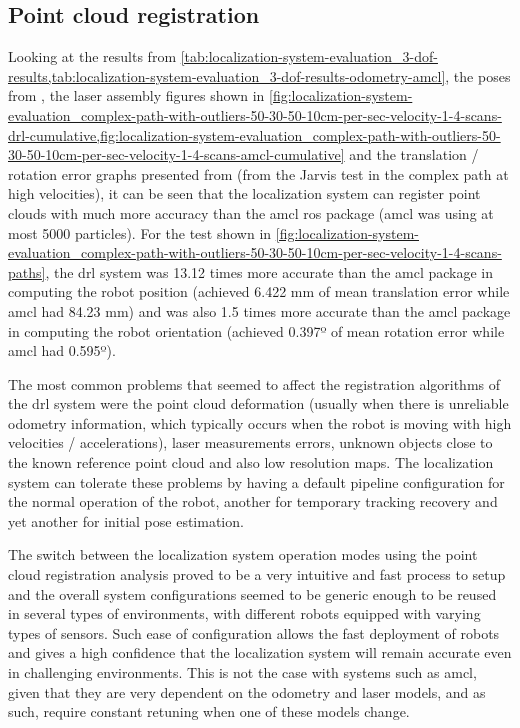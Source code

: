 \subsection{Point cloud registration}

Looking at the results from \cref{tab:localization-system-evaluation_3-dof-results,tab:localization-system-evaluation_3-dof-results-odometry-amcl}, the poses from , the laser assembly figures shown in \cref{fig:localization-system-evaluation_complex-path-with-outliers-50-30-50-10cm-per-sec-velocity-1-4-scans-drl-cumulative,fig:localization-system-evaluation_complex-path-with-outliers-50-30-50-10cm-per-sec-velocity-1-4-scans-amcl-cumulative} and the translation / rotation error graphs presented from  (from the Jarvis test in the complex path at high velocities), it can be seen that the localization system can register point clouds with much more accuracy than the \gls{amcl} \gls{ros} package (\gls{amcl} was using at most 5000 particles). For the test shown in \cref{fig:localization-system-evaluation_complex-path-with-outliers-50-30-50-10cm-per-sec-velocity-1-4-scans-paths}, the \gls{drl} system was 13.12 times more accurate than the \gls{amcl} package in computing the robot position (achieved 6.422 mm of mean translation error while \gls{amcl} had 84.23 mm) and was also 1.5 times more accurate than the \gls{amcl} package in computing the robot orientation (achieved 0.397º of mean rotation error while \gls{amcl} had 0.595º).

The most common problems that seemed to affect the registration algorithms of the \gls{drl} system were the point cloud deformation (usually when there is unreliable odometry information, which typically occurs when the robot is moving with high velocities / accelerations), laser measurements errors, unknown objects close to the known reference point cloud and also low resolution maps. The localization system can tolerate these problems by having a default pipeline configuration for the normal operation of the robot, another for temporary tracking recovery and yet another for initial pose estimation.

The switch between the localization system operation modes using the point cloud registration analysis proved to be a very intuitive and fast process to setup and the overall system configurations seemed to be generic enough to be reused in several types of environments, with different robots equipped with varying types of sensors. Such ease of configuration allows the fast deployment of robots and gives a high confidence that the localization system will remain accurate even in challenging environments. This is not the case with systems such as \gls{amcl}, given that they are very dependent on the odometry and laser models, and as such, require constant retuning when one of these models change.

